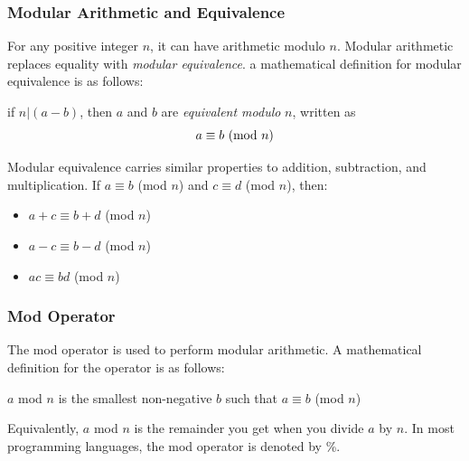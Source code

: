 \documentclass{article}
\begin{document}
\subsubsection{Modular Arithmetic and Equivalence}
For any positive integer \(n\), it can have arithmetic modulo \(n\).
Modular arithmetic replaces equality with \emph{modular equivalence}.
a mathematical definition for modular equivalence is as follows:
\begin{tcolorbox}[title=Modular Equivalence Definition]
    \begin{center}
        if \(n \vert (a - b)\), 
        then \(a\) and \(b\) are \emph{equivalent modulo} \(n\),
        written as
        \[a \equiv b\ \textnormal{(mod $n$)}\]
    \end{center}
\end{tcolorbox}
\noindent
Modular equivalence carries similar properties to addition, subtraction, and multiplication.
If $a \equiv b$ (mod $n$) and $c \equiv d$ (mod $n$), then:
\begin{itemize}
    \item $a + c \equiv b + d$ (mod $n$)
    \item $a - c \equiv b - d$ (mod $n$)
    \item $ac \equiv bd$ (mod $n$)
\end{itemize}
%
\subsubsection{Mod Operator}
The mod operator is used to perform modular arithmetic.
A mathematical definition for the operator is as follows:
\begin{tcolorbox}[title=Mod Operator Definition]
    \(a\) mod \(n\) is the smallest non-negative \(b\) such that \(a \equiv b\) (mod \(n\))
\end{tcolorbox}
\noindent
Equivalently, \(a\) mod \(n\) is the remainder you get when you divide \(a\) by \(n\).
In most programming languages, the mod operator is denoted by \%.
%
\end{document}

